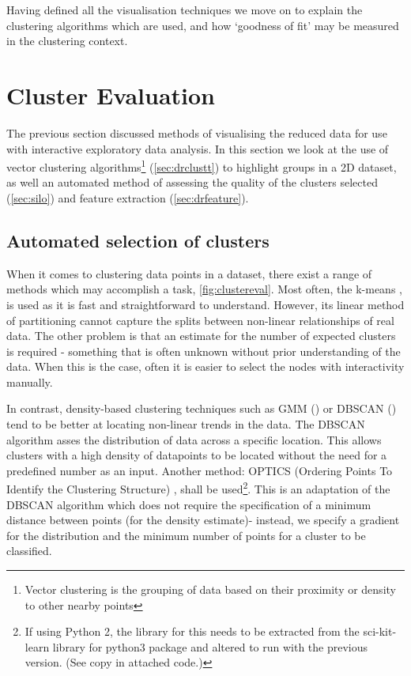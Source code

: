 Having defined all the visualisation techniques we move on to explain the clustering algorithms which are used, and how `goodness of fit' may be measured in the clustering context.


\section{Cluster Evaluation}
The previous section discussed methods of visualising the reduced data for use with interactive exploratory data analysis. In this section we look at the use of vector clustering algorithms\footnote{Vector clustering is the grouping of data based on their proximity or density to other nearby points} (\autoref{sec:drclustt}) to highlight groups in a 2D dataset, as well an automated method of assessing the quality of the clusters selected (\autoref{sec:silo}) and feature extraction (\autoref{sec:drfeature}).



\subsection{Automated selection of clusters}\label{sec:drclustt}
    When it comes to clustering data points in a dataset, there exist a range of methods which may accomplish a task, \autoref{fig:clustereval}. Most often, the k-means \citep{kmeans}, is used as it is fast and straightforward to understand. However, its linear method of partitioning cannot capture the splits between non-linear relationships of real data. The other problem is that an estimate for the number of expected clusters is required - something that is often unknown without prior understanding of the data. When this is the case, often it is easier to select the nodes with interactivity manually.

In contrast, density-based clustering techniques such as GMM (\citep{scikit}) or DBSCAN (\citep{DBSCAN}) tend to be better at locating non-linear trends in the data. The DBSCAN algorithm asses the distribution of data across a specific location. This allows clusters with a high density of datapoints to be located without the need for a predefined number as an input. Another method: OPTICS (Ordering Points To Identify the Clustering Structure) \citep{optics}, shall be used\footnote{ If using Python 2, the library for this needs to be extracted from the sci-kit-learn library for python3 package and altered to run with the previous version. (See copy in attached code.)}. This is an adaptation of the DBSCAN algorithm which does not require the specification of a minimum distance between points (for the density estimate)- instead, we specify a gradient for the distribution and the minimum number of points for a cluster to be classified.


